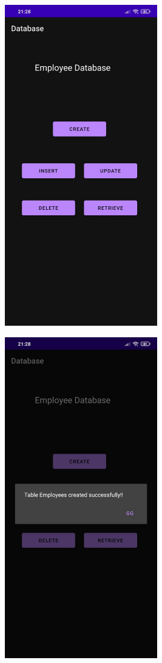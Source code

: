 \documentclass[12pt,letterpaper]{article}
\begin{document}
\subsubsection*{}
\begin{figure}[h]
    \centering
    \includegraphics[height=14cm, keepaspectratio]{Outputs/OP1.jpeg}
\end{figure}
\begin{figure}
    \centering
    \includegraphics[height=14cm, keepaspectratio]{Outputs/OP2.jpeg}
\end{figure}
\end{document}
